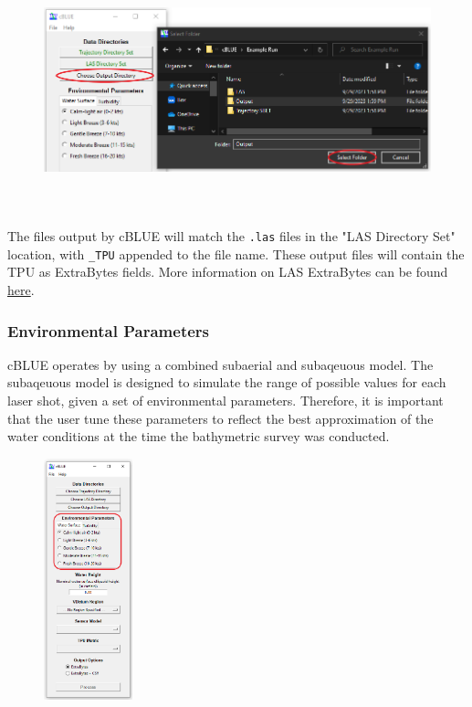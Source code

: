 \documentclass[11pt, a4paper]{article}
\begin{document}
\begin{figure}[H]
    \centering
    \includegraphics[height=7cm]{figs/select_output_gui.png}
\end{figure}

The files output by cBLUE will match the \texttt{.las} files in the "LAS Directory Set" location, with \texttt{\_TPU} appended to the file name. These output files will contain the TPU as ExtraBytes fields. More information on LAS ExtraBytes can be found \href{https://www.asprs.org/divisions-committees/lidar-division/laser-las-file-format-exchange-activities}{here}.

\subsubsection{Environmental Parameters}
cBLUE operates by using a combined subaerial and subaqeuous model. The subaqeuous model is designed to simulate the range of possible values for each laser shot, given a set of environmental parameters. Therefore, it is important that the user tune these parameters to reflect the best approximation of the water conditions at the time the bathymetric survey was conducted. 

\begin{figure}[H]
    \centering
    \includegraphics[height=7cm]{figs/cblue_env_params_gui.png}
\end{figure}
\end{document}
